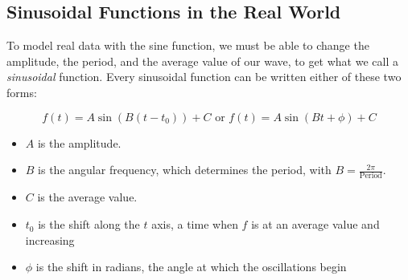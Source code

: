 \subsection*{Sinusoidal Functions in the Real World}

To model real data with the sine function, we must be able to change the amplitude, the
period, and the average value of our wave, to get what we call a \emph{sinusoidal}
function.  Every sinusoidal function can be written either of these two forms:

    \[ f(t) = A \sin( B ( t - t_0) ) + C \mbox{ or } f(t) = A \sin( B t + \phi) + C \]

\begin{itemize}
\item $A$ is the amplitude.  
\item $B$ is the angular frequency, which determines the period, with $B = \frac{2 \pi}{\mbox{Period}}$.  
\item $C$ is the average value.  
\item $t_0$ is the shift along the $t$ axis, a time when $f$ is at an average value and increasing
\item $\phi$ is the shift in radians, the angle at which the oscillations begin
\end{itemize}


